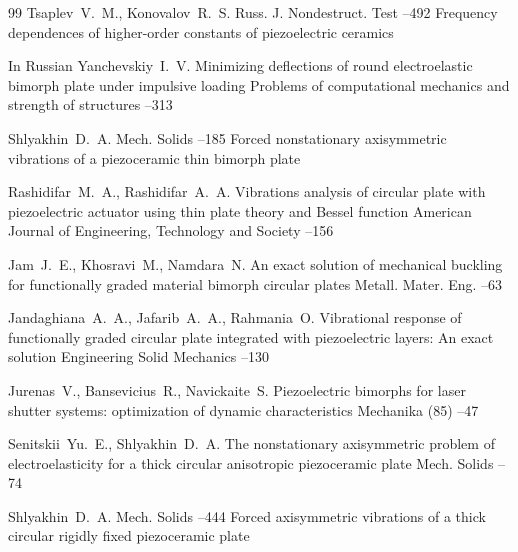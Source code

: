 \begin{thebibliography}{99}
\by Tsaplev~V.~M., Konovalov~R.~S.
\jour  Russ. J. Nondestruct. Test 
–492 
\paper Frequency dependences of higher-order constants of piezoelectric ceramics

   

\lang In Russian
\by Yanchevskiy~I.~V.
\paper Minimizing deflections of round electroelastic bimorph plate under impulsive loading
\jour  Problems of computational mechanics and strength of structures 
--313

\by Shlyakhin~D.~A.
\jour  Mech. Solids 
–185 
\paper Forced nonstationary axisymmetric vibrations of a piezoceramic thin bimorph plate

\by Rashidifar~M.~A., Rashidifar~A.~A.
\paper Vibrations analysis of circular plate with piezoelectric actuator using thin plate theory and Bessel function
\jour American Journal of Engineering, Technology and Society
--156



\by Jam~J.~E., Khosravi~M., Namdara~N.
\paper  An exact solution of mechanical buckling for functionally graded material bimorph circular 
plates
\jour Metall. Mater. Eng.
--63

\by Jandaghiana~A.~A., Jafarib~A.~A., Rahmania~O.
\paper Vibrational response of functionally graded circular plate integrated with piezoelectric layers: An 
exact solution
\jour Engineering Solid Mechanics
--130

\by  Jurenas~V., Bansevicius~R., Navickaite~S.
\paper Piezoelectric bimorphs for laser shutter systems: optimization of dynamic characteristics
\jour Mechanika
(85)
--47 


\by Senitskii~Yu.~E., Shlyakhin~D.~A.
\paper The nonstationary axisymmetric problem of electroelasticity for a thick circular anisotropic piezoceramic plate
\jour Mech. Solids 
--74 

\by Shlyakhin~D.~A.
\jour  Mech. Solids 
–444 
\paper Forced axisymmetric vibrations of a thick circular rigidly fixed piezoceramic plate


\end{thebibliography}
